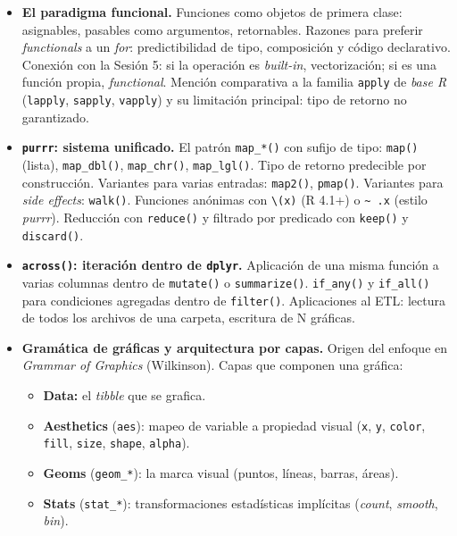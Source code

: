 \documentclass[11pt,letterpaper]{article}
\begin{document}
\begin{itemize}[leftmargin=*, itemsep=2pt]
    \item \textbf{El paradigma funcional.} Funciones como objetos de primera clase: asignables, pasables como argumentos, retornables. Razones para preferir \textit{functionals} a un \textit{for}: predictibilidad de tipo, composición y código declarativo. Conexión con la Sesión 5: si la operación es \textit{built-in}, vectorización; si es una función propia, \textit{functional}. Mención comparativa a la familia \texttt{apply} de \textit{base R} (\texttt{lapply}, \texttt{sapply}, \texttt{vapply}) y su limitación principal: tipo de retorno no garantizado.
    \item \textbf{\texttt{purrr}: sistema unificado.} El patrón \texttt{map\_*()} con sufijo de tipo: \texttt{map()} (lista), \texttt{map\_dbl()}, \texttt{map\_chr()}, \texttt{map\_lgl()}. Tipo de retorno predecible por construcción. Variantes para varias entradas: \texttt{map2()}, \texttt{pmap()}. Variantes para \textit{side effects}: \texttt{walk()}. Funciones anónimas con \texttt{\textbackslash(x)} (R 4.1+) o \texttt{\textasciitilde{} .x} (estilo \textit{purrr}). Reducción con \texttt{reduce()} y filtrado por predicado con \texttt{keep()} y \texttt{discard()}.
    \item \textbf{\texttt{across()}: iteración dentro de \texttt{dplyr}.} Aplicación de una misma función a varias columnas dentro de \texttt{mutate()} o \texttt{summarize()}. \texttt{if\_any()} y \texttt{if\_all()} para condiciones agregadas dentro de \texttt{filter()}. Aplicaciones al ETL: lectura de todos los archivos de una carpeta, escritura de N gráficas.
    \item \textbf{Gramática de gráficas y arquitectura por capas.} Origen del enfoque en \textit{Grammar of Graphics} (Wilkinson). Capas que componen una gráfica:
    \begin{itemize}[leftmargin=*, itemsep=1pt, label=$\circ$]
        \item \textbf{Data:} el \textit{tibble} que se grafica.
        \item \textbf{Aesthetics} (\texttt{aes}): mapeo de variable a propiedad visual (\texttt{x}, \texttt{y}, \texttt{color}, \texttt{fill}, \texttt{size}, \texttt{shape}, \texttt{alpha}).
        \item \textbf{Geoms} (\texttt{geom\_*}): la marca visual (puntos, líneas, barras, áreas).
        \item \textbf{Stats} (\texttt{stat\_*}): transformaciones estadísticas implícitas (\textit{count}, \textit{smooth}, \textit{bin}).

\end{itemize}
\end{itemize}
\end{document}
